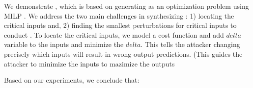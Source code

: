 \label{section:limitations}








We demonstrate \tool, which is based on generating \attack as an optimization problem using MILP . We address the two main challenges in synthesizing \attack: 1) locating the critical inputs and, 2) finding the smallest perturbations for critical inputs to conduct \attack. To locate the critical inputs, we model a cost function and add $delta$ variable to the inputs and minimize the $delta$. This tells the attacker changing precisely which inputs will result in wrong output predictions. 
(This guides the attacker to minimize the inputs to mazimize the outputs 


Based on our experiments, we conclude that:

